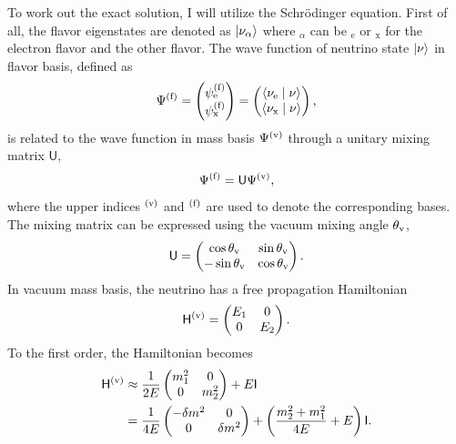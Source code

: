 To work out the exact solution, I will utilize the Schr\"{o}dinger equation. First of all, the flavor eigenstates are denoted as $\left| \nu_\alpha\right\rangle$ where ${}_\alpha$ can be ${}_{\mathrm{e}}$ or ${}_{\mathrm{x}}$ for the electron flavor and the other flavor. The wave function of neutrino state $\left| \nu\right\rangle$ in flavor basis, defined as
\begin{equation}
    \Psi^{(\mathrm f)} = \begin{pmatrix}
        \psi^{(\mathrm f)}_{\mathrm e} \\
        \psi^{(\mathrm f)}_{\mathrm x} 
    \end{pmatrix} = \begin{pmatrix}
        \langle \nu_{\mathrm e} \mid \nu \rangle \\
        \langle \nu_{\mathrm x} \mid \nu \rangle
    \end{pmatrix},
\end{equation}
is related to the wave function in mass basis $\Psi^{(\mathrm v)}$ through a unitary mixing matrix $\mathsf U$,
\begin{equation}
\Psi^{(\mathrm f)} = \mathsf{U}\Psi^{(\vv)},
\label{chap:vacuum-eqn:wavefunction}
\end{equation}
where the upper indices ${}^{(\mathrm v)}$ and ${}^{(\mathrm f)}$ are used to denote the corresponding bases. The mixing matrix can be expressed using the vacuum mixing angle $\theta_{\mathrm v}$,
\begin{equation}
\mathsf{U} = \begin{pmatrix} \cos\theta_\mathrm v & \sin \theta_\mathrm v \\ -\sin \theta_\mathrm v & \cos \theta_\mathrm v \end{pmatrix}.
\end{equation}
In vacuum mass basis, the neutrino has a free propagation Hamiltonian
\begin{equation}
\mathsf H^{(\mathrm v)} = \begin{pmatrix} E_1 & 0 \\
0 & E_2
\end{pmatrix}.
\end{equation}
To the first order, the Hamiltonian becomes
\begin{align}
\mathsf H^{(\mathrm v)} &\approx \frac{1}{2E} \begin{pmatrix}
m_1^2 & 0 \\
0 & m_2^2
\end{pmatrix} + E \mathsf{I} \nonumber \\
& =  \frac{1}{4E} \begin{pmatrix}
 - \delta m^2 & 0 \\
0 & \delta m^2
\end{pmatrix}  + \left(\frac{m_2^2 + m_1^2}{4E}  + E \right) \mathsf{I}.
\end{align}
